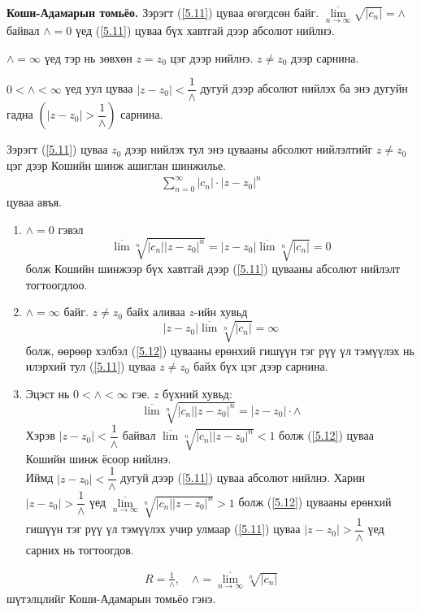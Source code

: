 \begin{thm}
\textbf{Коши-Адамарын томьёо. }  Зэрэгт (\ref{5.11}) цуваа өгөгдсөн байг. $\overline{\lim\limits_{n\rightarrow \infty}} \sqrt{ |c_n|}= \wedge$ байвал $\wedge =0$ үед (\ref{5.11}) цуваа бүх хавтгай дээр абсолют нийлнэ.

$\wedge =\infty$ үед тэр нь зөвхөн $z=z_0$ цэг дээр нийлнэ. $z\neq z_0$ дээр сарнина.

$0<\wedge <\infty$ үед уул цуваа $|z-z_0|<\dfrac{1}{\wedge}$ дугуй дээр абсолют нийлэх ба энэ дугуйн гадна $\left(|z-z_0|>\dfrac{1}{\wedge}\right)$ сарнина.
\end{thm}
\begin{prf}
Зэрэгт (\ref{5.11}) цуваа $z_0$ дээр нийлэх тул энэ цувааны абсолют нийлэлтийг $z\neq z_0$ цэг дээр Кошийн шинж ашиглан
шинжилье.
\begin{eqnarray} \label{5.12}
    \sum\limits_{n=0}^\infty |c_n|\cdot |z-z_0|^n
\end{eqnarray} цуваа авъя. 
\begin{enumerate}
    \item [a)] $\wedge = 0$ гэвэл
    $$\overline{\lim} \sqrt[n]{|c_n||z-z_0|^n}=|z-z_0|\overline{\lim}\sqrt[n]{|c_n|}=0$$
    болж Кошийн шинжээр бүх хавтгай дээр (\ref{5.11}) цувааны абсолют нийлэлт тогтоогдлоо.
    \item [б)] $\wedge =\infty$ байг. $z\neq z_0$ байх аливаа $z$-ийн хувьд
    $$|z-z_0|\overline{\lim}\sqrt[n]{|c_n|}=\infty$$
    болж, өөрөөр хэлбэл (\ref{5.12}) цувааны ерөнхий гишүүн тэг рүү үл тэмүүлэх нь илэрхий тул (\ref{5.11}) цуваа $ z\neq z_0$ байх бүх цэг дээр сарнина.
    \item [в)] Эцэст нь $0<\wedge <\infty$ гэе. $z$ бүхний хувьд:
    $$\overline{\lim}\sqrt[n]{|c_n||z-z_0|^n}=|z-z_0|\cdot \wedge$$
Хэрэв $|z-z_0|<\dfrac{1}{\wedge}$ байвал $\overline{\lim}\sqrt[n]{|c_n||z-z_0|^n}<1$ болж (\ref{5.12}) цуваа Кошийн шинж ёсоор нийлнэ. \\ Иймд $|z-z_0|<\dfrac{1}{\wedge}$ дугуй дээр (\ref{5.11}) цуваа абсолют нийлнэ. Харин $|z-z_0|>\dfrac{1}{\wedge}$ үед $\overline{\lim\limits_{n\rightarrow\infty}}\sqrt[n]{|c_n||z-z_0|^n}>1$ болж (\ref{5.12}) цувааны ерөнхий гишүүн
тэг рүү үл тэмүүлэх учир улмаар (\ref{5.11}) цуваа $|z-z_0|>\dfrac{1}{\wedge}$ үед сарних нь тогтоогдов. 
\end{enumerate}
 \end{prf}
\begin{hnt}
\begin{eqnarray} \label{5.18}
    R=\frac{1}{\wedge}, \quad \wedge =\overline{\lim\limits_{n\rightarrow \infty}} \sqrt[n]{|c_n|}
\end{eqnarray}
шүтэлцлийг Коши-Адамарын томьёо гэнэ.
\end{hnt}
